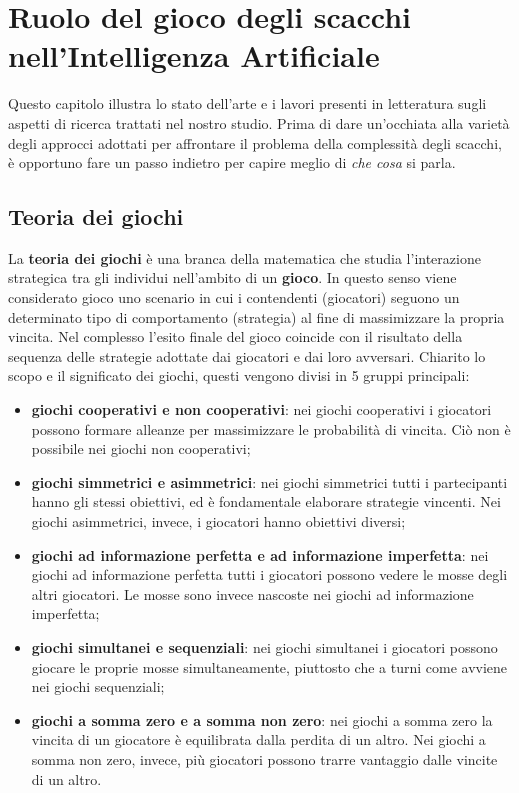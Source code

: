 \chapter{Ruolo del gioco degli scacchi nell'Intelligenza Artificiale} %
%
\begin{citazione}
    Questo capitolo illustra lo stato dell'arte e i lavori presenti in letteratura sugli aspetti di ricerca trattati nel nostro studio. 
    Prima di dare un'occhiata alla varietà degli approcci adottati per affrontare il problema della complessità degli scacchi, è opportuno fare un passo indietro per capire meglio di \textit{che cosa} si parla.
\end{citazione}
\section{Teoria dei giochi}
La \textbf{teoria dei giochi}\cite{colombo2003introduzione} è una branca della matematica che studia l'interazione strategica tra gli individui nell'ambito di un \textbf{gioco}. In questo senso viene considerato gioco uno scenario in cui i contendenti (giocatori) seguono un determinato tipo di comportamento (strategia) al fine di massimizzare la propria vincita. Nel complesso l'esito finale del gioco coincide con il risultato della sequenza delle strategie adottate dai giocatori e dai loro avversari. Chiarito lo scopo e il significato dei giochi, questi vengono divisi in 5 gruppi principali:
\begin{itemize}
    \item \textbf{giochi cooperativi e non cooperativi}: nei giochi cooperativi i giocatori possono formare alleanze per massimizzare le probabilità di vincita. Ciò non è possibile nei giochi non cooperativi;
    \item \textbf{giochi simmetrici e asimmetrici}: nei giochi simmetrici tutti i partecipanti hanno gli stessi obiettivi, ed è fondamentale elaborare strategie vincenti. Nei giochi asimmetrici, invece, i giocatori hanno obiettivi diversi;
    \item \textbf{giochi ad informazione perfetta e ad informazione imperfetta}: nei giochi ad informazione perfetta tutti i giocatori possono vedere le mosse degli altri giocatori. Le mosse sono invece nascoste nei giochi ad informazione imperfetta;
    \item \textbf{giochi simultanei e sequenziali}: nei giochi simultanei i giocatori possono giocare le proprie mosse simultaneamente, piuttosto che a turni come avviene nei giochi sequenziali;
    \item \textbf{giochi a somma zero e a somma non zero}: nei giochi a somma zero la vincita di un giocatore è equilibrata dalla perdita di un altro. Nei giochi a somma non zero, invece, più giocatori possono trarre vantaggio dalle vincite di un altro.
\end{itemize}
